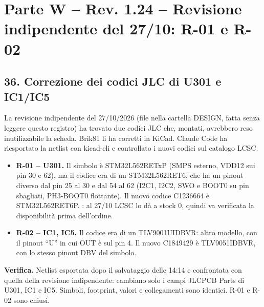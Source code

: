\clearpage
\section[Parte W – Rev. 1.24 – Revisione indipendente del 27/\allowbreak{}10: R-01 e R-02]{Parte W – Rev. 1.24 – Revisione indipendente del 27/\allowbreak{}10: R-01 e R-02}

\subsection[36. Correzione dei codici JLC di U301 e IC1/\allowbreak{}IC5]{36. Correzione dei codici JLC di U301 e IC1/\allowbreak{}IC5}

La revisione indipendente del 27/\allowbreak{}10/\allowbreak{}2026 (file  nella cartella DESIGN, fatta senza leggere questo registro) ha trovato due codici JLC che, montati, avrebbero reso inutilizzabile la scheda. Brik81 li ha corretti in KiCad. Claude Code ha riesportato la netlist con kicad-cli e controllato i nuovi codici sul catalogo LCSC.

\begin{itemize}
\item \textbf{R-01 – U301.} Il simbolo è STM32L562RETxP (SMPS esterno, VDD12 sui pin 30 e 62), ma il codice era di un STM32L562RET6, che ha un pinout diverso dal pin 25 al 30 e dal 54 al 62 (I2C1, I2C2, SWO e BOOT0 su pin sbagliati, PH3-BOOT0 flottante). Il nuovo codice C1236664 è STM32L562RET6P. : al 27/\allowbreak{}10 LCSC lo dà a stock 0, quindi va verificata la disponibilità prima dell'ordine.
\item \textbf{R-02 – IC1, IC5.} Il codice era di un TLV9001UIDBVR: altro modello, con il pinout \textquotedblleft{}U\textquotedblright{} in cui OUT è sul pin 4. Il nuovo C1849429 è TLV9051IDBVR, con lo stesso pinout DBV del simbolo.
\end{itemize}

\textbf{Verifica.} Netlist esportata dopo il salvataggio delle 14:14 e confrontata con quella della revisione indipendente: cambiano solo i campi JLCPCB Parts di U301, IC1 e IC5. Simboli, footprint, valori e collegamenti sono identici. R-01 e R-02 sono chiusi.
